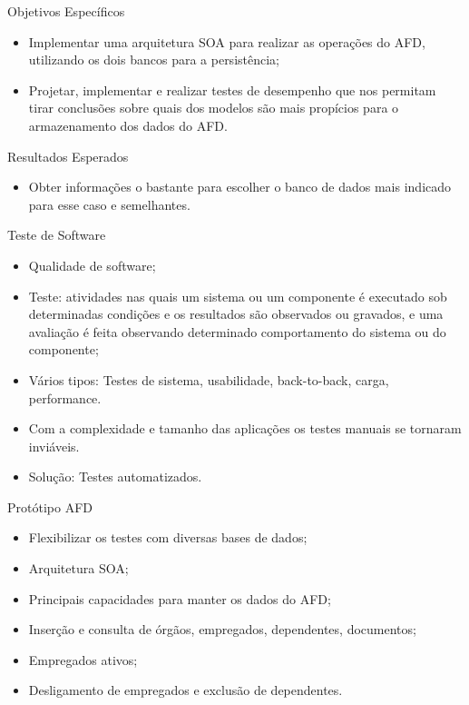 \begin{frame}{Objetivos Específicos}
    \begin{itemize}
    \item Implementar uma arquitetura SOA para realizar as operações do AFD, utilizando os dois bancos para a persistência;
   \item Projetar, implementar e realizar testes de desempenho que nos permitam tirar conclusões sobre quais dos modelos são mais propícios para o armazenamento dos dados do AFD.
    \end{itemize}
\end{frame}

\begin{frame}{Resultados Esperados}
    \begin{itemize}
    \item Obter informações o bastante para escolher o banco de dados mais indicado para esse caso e semelhantes.
    \end{itemize}
\end{frame}


\begin{frame}{Teste de Software}
    \begin{itemize}
    \item Qualidade de software;
    \item Teste: atividades nas quais um sistema ou um componente é executado sob determinadas
condições e os resultados são observados ou gravados, e uma avaliação é
feita observando determinado comportamento do sistema ou do componente; 
    \item Vários tipos: Testes de sistema, usabilidade, back-to-back, carga, performance.
    \item Com a complexidade e tamanho das aplicações os testes manuais se tornaram inviáveis.
    \item Solução: Testes automatizados.
    \end{itemize}
\end{frame}

\begin{frame}{Protótipo AFD}
    \begin{itemize}
    \item Flexibilizar os testes com diversas bases de dados;
    \item Arquitetura SOA;
    \item Principais capacidades para manter os dados do AFD;
    \item Inserção e consulta de órgãos, empregados, dependentes, documentos;
    \item Empregados ativos;
    \item Desligamento de empregados e exclusão de dependentes.
    \end{itemize}
\end{frame}

